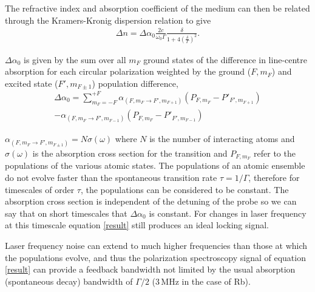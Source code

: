 \documentclass{article}
\begin{document}
\begin{multicols}{2}
The refractive index and absorption coefficient of the medium can then be related through the Kramers-Kronig dispersion relation\cite{demtroder_laser_2003} to give
\begin{align}
\Delta n = \Delta\alpha_0 \frac{2c}{\omega_0 \Gamma}\frac{\delta}{1+4\left(\frac{\delta}{\Gamma}\right)^2}.\label{result}
\end{align}

$\Delta\alpha_0$ is given by the sum over all $m_F$ ground states of the difference in line-centre absorption for each circular polarization weighted by the ground ($F, m_F$) and excited state ($F', m_{F\pm1}$) population difference,
\begin{align}
\Delta\alpha_0 = \sum_{m_F=-F}^{+F} \alpha_{(F,m_F\rightarrow F',m_{F+1})}(P_{F,m_F}-P'_{F',m_{F+1}})\nonumber\\
-\alpha_{(F,m_F\rightarrow F',m_{F-1})}(P_{F,m_F}-P'_{F',m_{F-1}})
\end{align}

$\alpha_{(F, m_F\rightarrow F',m_{F\pm1})}=N \sigma(\omega)$ where $N$ is the number of interacting atoms and $\sigma(\omega)$ is the absorption cross section for the transition and $P_{F,m_F}$ refer to the populations of the various atomic states. The populations of an atomic ensemble do not evolve faster than the spontaneous transition rate $\tau=1/\Gamma$, therefore for timescales of order $\tau$, the populations can be considered to be constant. The absorption cross section is independent of the detuning of the probe so we can say that on short timescales that $\Delta\alpha_0$ is constant. For changes in laser frequency at this timescale equation \ref{result} still produces an ideal locking signal.

Laser frequency noise can extend to much higher frequencies than those at which the populations evolve, and thus the polarization spectroscopy signal of equation \ref{result} can provide a feedback bandwidth not limited by the usual absorption (spontaneous decay) bandwidth of $\Gamma/2$ (3\,MHz in the case of Rb).


\end{multicols}
\end{document}
